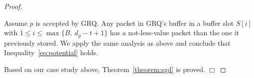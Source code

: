 \documentclass[final, 11pt]{article}
\begin{document}
\begin{proof}
\begin{enumerate}
Assume $p$ is accepted by GRQ. Any packet in GRQ's buffer in a buffer slot $S[i]$ with $1 \le i \le \max\{B, \ d_p - t + 1\}$ has a not-less-value packet than the one it previously stored. We apply the same analysis as above and conclude that Inequality~\ref{eq:potential} holds.
\end{enumerate}



Based on our case study above, Theorem~\ref{theorem:sgd} is proved. $\Box$
\end{proof}





\end{document}
